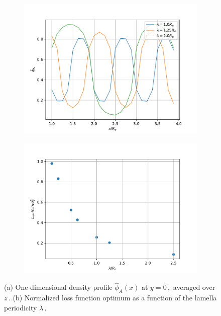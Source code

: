 \documentclass[bachelor,       %
               oneside,        %
               BCOR10mm,       %
               ngerman, english %
               ]{GAUBM}
\begin{document}
\begin{figure}[h]
  \centering
  \begin{subfigure}[b]{0.45\textwidth}
      \centering
      \includegraphics[width=\textwidth]{figures/amplitude_lamella_per.pdf}
      \caption{}
      \label{fig:amplitude_lamella_per}
  \end{subfigure}
    \hfill
  \begin{subfigure}[b]{0.45\textwidth}
      \centering
      \includegraphics[width=\textwidth]{Thesis/figures/L_lambda.pdf}
      \caption{}
      \label{fig:L-lambda}
  \end{subfigure}
     \caption{(a) One dimensional density profile $\hat\phi_A(x)$ at $y=0\,,$ averaged over $z\,.$ (b) Normalized loss function optimum as a function of the lamella periodicity $\lambda\,.$}
     \label{fig:periodicity-lossfunction}
\end{figure}
\end{document}
